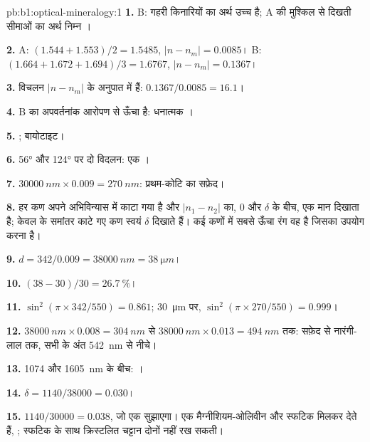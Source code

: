 \begin{solution}{pb:b1:optical-mineralogy:1}
\textbf{1.} B: गहरी किनारियों का अर्थ उच्च  है; A की मुश्किल से दिखती सीमाओं का अर्थ निम्न ।

\textbf{2.} A: $(1.544 + 1.553)/2 = 1.5485$, $|n - n_m| = 0.0085$। B:
$(1.664 + 1.672 + 1.694)/3 = 1.6767$, $|n - n_m| = 0.1367$।

\textbf{3.} विचलन $|n - n_m|$ के अनुपात में हैं: $0.1367/0.0085 =
16.1$।

\textbf{4.} B का अपवर्तनांक आरोपण से ऊँचा है: धनात्मक ।

\textbf{5.} ; बायोटाइट।

\textbf{6.} \ang{56} और \ang{124} पर दो विदलन: एक ।

\textbf{7.} $\qty{30000}{nm}\times0.009 = \qty{270}{nm}$: प्रथम-कोटि का सफ़ेद।

\textbf{8.} हर कण अपने अभिविन्यास में काटा गया है और $|n_1 - n_2|$ का, 0 और $\delta$ के बीच, एक मान दिखाता है; केवल  के समांतर काटे गए कण स्वयं $\delta$ दिखाते हैं। कई कणों में सबसे ऊँचा रंग वह है जिसका उपयोग करना है।

\textbf{9.} $d = 342/0.009 = \qty{38000}{nm} = \qty{38}{\micro m}$।

\textbf{10.} $(38 - 30)/30 = \qty{26.7}{\percent}$।

\textbf{11.} $\sin^2(\pi\times342/550) = 0.861$; \qty{30}{\micro m} पर,
$\sin^2(\pi\times270/550) = 0.999$।

\textbf{12.} $\qty{38000}{nm}\times0.008 = \qty{304}{nm}$ से
$\qty{38000}{nm}\times0.013 = \qty{494}{nm}$ तक: सफ़ेद से नारंगी-लाल तक, सभी  के अंत \qty{542}{nm} से नीचे।

\textbf{13.} 1074 और \qty{1605}{nm} के बीच: ।

\textbf{14.} $\delta = 1140/38000 = 0.030$।

\textbf{15.} $1140/30000 = 0.038$, जो एक  सुझाएगा। एक मैग्नीशियम-ओलिवीन और स्फटिक मिलकर  देते
हैं, ; स्फटिक के साथ क्रिस्टलित चट्टान दोनों नहीं रख सकती।


\end{solution}
